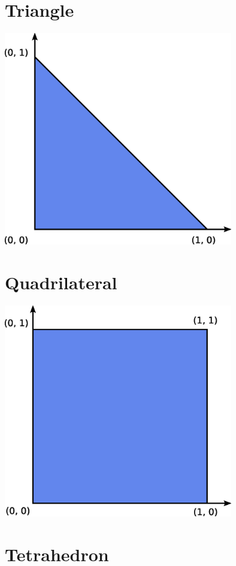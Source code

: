 \newpage
\section{Triangle}

\includegraphics[width=10cm]{eps/triangle.eps}

\newpage
\section{Quadrilateral}

\includegraphics[width=10cm]{eps/quadrilateral.eps}

\newpage
\section{Tetrahedron}

